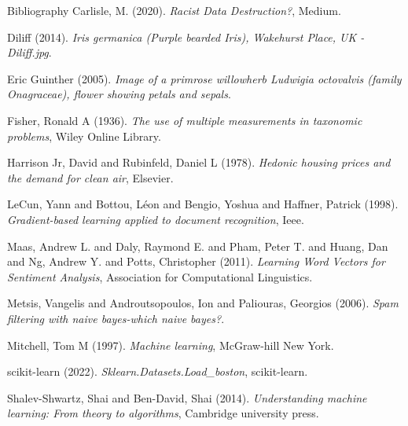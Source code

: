 \documentclass[10pt]{beamer}
\begin{document}
\begin{frame}[fragile,allowframebreaks,label=]{Bibliography}
\noindent
Carlisle, M. (2020). \emph{Racist Data Destruction?}, Medium.

\noindent
Diliff (2014). \emph{Iris germanica (Purple bearded Iris), Wakehurst Place, UK - Diliff.jpg}.

\noindent
Eric Guinther (2005). \emph{Image of a primrose willowherb Ludwigia octovalvis (family Onagraceae), flower showing petals and sepals}.

\noindent
Fisher, Ronald A (1936). \emph{The use of multiple measurements in taxonomic problems}, Wiley Online Library.

\noindent
Harrison Jr, David and Rubinfeld, Daniel L (1978). \emph{Hedonic housing prices and the demand for clean air}, Elsevier.

\noindent
LeCun, Yann and Bottou, L{\'e}on and Bengio, Yoshua and Haffner, Patrick (1998). \emph{Gradient-based learning applied to document recognition}, Ieee.

\noindent
Maas, Andrew L. and Daly, Raymond E. and Pham, Peter T. and Huang, Dan and Ng, Andrew Y. and Potts, Christopher (2011). \emph{Learning Word Vectors for Sentiment Analysis}, Association for Computational Linguistics.

\noindent
Metsis, Vangelis and Androutsopoulos, Ion and Paliouras, Georgios (2006). \emph{Spam filtering with naive bayes-which naive bayes?}.

\noindent
Mitchell, Tom M (1997). \emph{Machine learning}, McGraw-hill New York.

\noindent
scikit-learn (2022). \emph{Sklearn.Datasets.Load\_boston}, scikit-learn.

\noindent
Shalev-Shwartz, Shai and Ben-David, Shai (2014). \emph{Understanding machine learning: From theory to algorithms}, Cambridge university press.
\end{frame}
\end{document}
